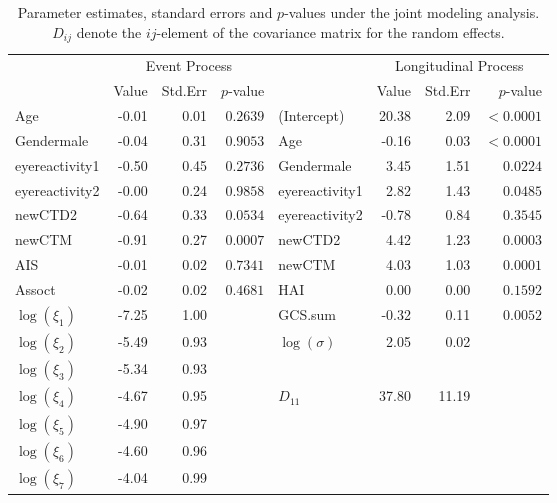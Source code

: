 \documentclass{article}
\begin{document}
\begin{table}[]
\centering
\begin{tabular}{lrrrlrrr}
  \hline
  & \multicolumn{3}{c}{Event Process} & & \multicolumn{3}{c}{Longitudinal Process}\\
  & Value & Std.Err & $p$-value &   & Value & Std.Err & $p$-value \\ 
  \hline
Age & -0.01 & 0.01 & $0.2639$ & (Intercept) & 20.38 & 2.09 & $<0.0001$ \\ 
  Gendermale & -0.04 & 0.31 & $0.9053$ & Age & -0.16 & 0.03 & $<0.0001$ \\ 
  eyereactivity1 & -0.50 & 0.45 & $0.2736$ & Gendermale & 3.45 & 1.51 & $0.0224$ \\ 
  eyereactivity2 & -0.00 & 0.24 & $0.9858$ & eyereactivity1 & 2.82 & 1.43 & $0.0485$ \\ 
  newCTD2 & -0.64 & 0.33 & $0.0534$ & eyereactivity2 & -0.78 & 0.84 & $0.3545$ \\ 
  newCTM & -0.91 & 0.27 & $0.0007$ & newCTD2 & 4.42 & 1.23 & $0.0003$ \\ 
  AIS & -0.01 & 0.02 & $0.7341$ & newCTM & 4.03 & 1.03 & $0.0001$ \\ 
  Assoct & -0.02 & 0.02 & $0.4681$ & HAI & 0.00 & 0.00 & $0.1592$ \\ 
  $\log(\xi_1)$ & -7.25 & 1.00 &  & GCS.sum & -0.32 & 0.11 & $0.0052$ \\ 
  $\log(\xi_2)$ & -5.49 & 0.93 &  & $\log(\sigma)$ & 2.05 & 0.02 &  \\ 
  $\log(\xi_3)$ & -5.34 & 0.93 &  &  &  &  &  \\ 
  $\log(\xi_4)$ & -4.67 & 0.95 &  & $D_{11}$ & 37.80 & 11.19 &  \\ 
  $\log(\xi_5)$ & -4.90 & 0.97 &  &  &  &  &  \\ 
  $\log(\xi_6)$ & -4.60 & 0.96 &  &  &  &  &  \\ 
  $\log(\xi_7)$ & -4.04 & 0.99 &  &  &  &  &  \\ 
   \hline
\end{tabular}
\caption{Parameter estimates, standard errors and $p$-values under the joint modeling analysis. $D_{ij}$ denote the $ij$-element of the covariance matrix for the random effects.} 
\end{table}



\end{document}
